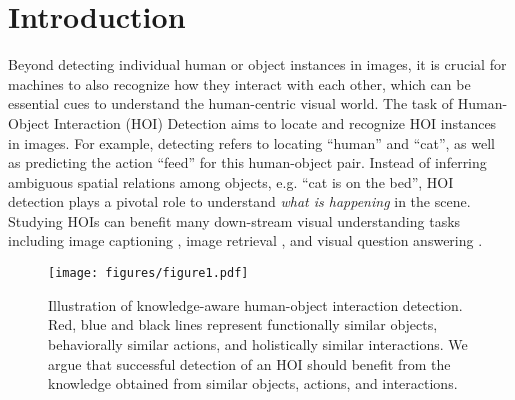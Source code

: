 \documentclass[sigconf,screen]{acmart}
\begin{document}


\maketitle

\section{Introduction}

Beyond detecting individual human or object instances in images, it is crucial for machines to also recognize how they interact with each other, which can be essential cues to understand the human-centric visual world. The task of Human-Object Interaction (HOI) Detection aims to locate and recognize HOI instances in images. For example, detecting  refers to locating ``human'' and ``cat'', as well as predicting the action ``feed'' for this human-object pair. Instead of inferring ambiguous spatial relations among objects, e.g. ``cat is on the bed'', HOI detection plays a pivotal role to understand \textit{what is happening} in the scene. Studying HOIs can benefit many down-stream visual understanding tasks including image captioning \cite{li2017scene}, image retrieval \cite{xu2017scene}, and visual question answering \cite{goyal2017making}.

\begin{figure}
\centering
\texttt{[image: figures/figure1.pdf]}
\caption{Illustration of knowledge-aware human-object interaction detection. Red, blue and black lines represent functionally similar objects, behaviorally similar actions, and holistically similar interactions. We argue that successful detection of an HOI should benefit from the knowledge obtained from similar objects, actions, and interactions.}
\label{fig1}
\end{figure}
\end{document}
